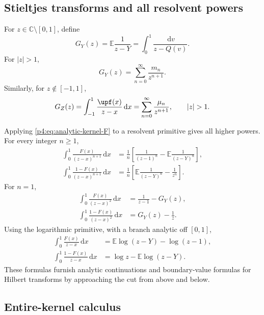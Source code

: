 \documentclass[11pt,oneside]{article}
\theoremstyle{definition}
\theoremstyle{remark}
\newcommand{\F}{F}
\newcommand{\Q}{Q}
\newcommand{\E}{\mathbb E}
\newcommand{\C}{\mathbb C}
\newcommand{\dd}{\,\mathrm d}
\newcommand{\1}{\mathbf 1}
\begin{document}
\subsection{Stieltjes transforms and all resolvent powers}

For \(z\in\C\setminus[0,1]\), define
\begin{equation}\label{p4:eq:GY-def}
 G_Y(z)=\E\frac1{z-Y}
 =\int_0^1\frac{\dd v}{z-\Q(v)}.
\end{equation}
For \(|z|>1\),
\begin{equation}\label{p4:eq:GY-moment-series}
 G_Y(z)=\sum_{n=0}^{\infty}\frac{m_n}{z^{n+1}}.
\end{equation}
Similarly, for \(z\notin[-1,1]\),
\begin{equation}\label{p4:eq:GZ-def}
 G_Z(z)=\int_{-1}^1\frac{\upf(x)}{z-x}\dd x
 =\sum_{n=0}^{\infty}\frac{\mu_n}{z^{n+1}},
 \qquad |z|>1.
\end{equation}

Applying \cref{p4:eq:analytic-kernel-F} to a resolvent primitive gives all higher powers.
For every integer \(n\ge1\),
\begin{align}
 \int_0^1\frac{\F(x)}{(z-x)^{n+1}}\dd x
 &=\frac1n\left[\frac1{(z-1)^n}-\E\frac1{(z-Y)^n}\right],
 \label{p4:eq:resolvent-F-n}\\
 \int_0^1\frac{1-\F(x)}{(z-x)^{n+1}}\dd x
 &=\frac1n\left[\E\frac1{(z-Y)^n}-\frac1{z^n}\right].
 \label{p4:eq:resolvent-up-n}
\end{align}
For \(n=1\),
\begin{align}
 \int_0^1\frac{\F(x)}{(z-x)^2}\dd x
 &=\frac1{z-1}-G_Y(z),\label{p4:eq:resolvent-F-2}\\
 \int_0^1\frac{1-\F(x)}{(z-x)^2}\dd x
 &=G_Y(z)-\frac1z.\label{p4:eq:resolvent-up-2}
\end{align}
Using the logarithmic primitive, with a branch analytic off \([0,1]\),
\begin{align}
 \int_0^1\frac{\F(x)}{z-x}\dd x
 &=\E\log(z-Y)-\log(z-1),
 \label{p4:eq:log-resolvent-F}\\
 \int_0^1\frac{1-\F(x)}{z-x}\dd x
 &=\log z-\E\log(z-Y).
 \label{p4:eq:log-resolvent-up}
\end{align}
These formulas furnish analytic continuations and boundary-value formulas for Hilbert
transforms by approaching the cut from above and below.

\subsection{Entire-kernel calculus}
\end{document}
